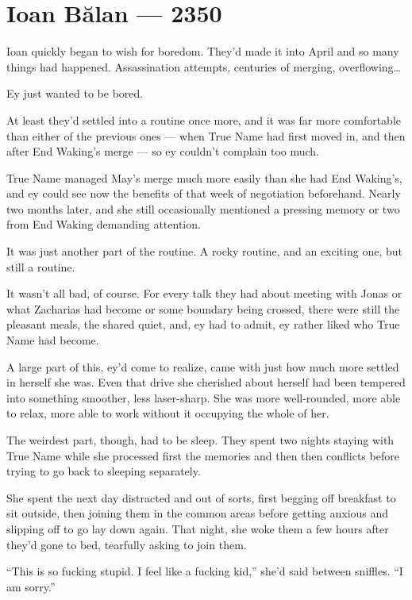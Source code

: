 \hypertarget{ioan-bux103lan-2350}{%
\chapter{Ioan Bălan — 2350}\label{ioan-bux103lan-2350}}

Ioan quickly began to wish for boredom. They'd made it into April and so many things had happened. Assassination attempts, centuries of merging, overflowing\ldots{}

Ey just wanted to be bored.

At least they'd settled into a routine once more, and it was far more comfortable than either of the previous ones — when True Name had first moved in, and then after End Waking's merge — so ey couldn't complain too much.

True Name managed May's merge much more easily than she had End Waking's, and ey could see now the benefits of that week of negotiation beforehand. Nearly two months later, and she still occasionally mentioned a pressing memory or two from End Waking demanding attention.

It was just another part of the routine. A rocky routine, and an exciting one, but still a routine.

It wasn't all bad, of course. For every talk they had about meeting with Jonas or what Zacharias had become or some boundary being crossed, there were still the pleasant meals, the shared quiet, and, ey had to admit, ey rather liked who True Name had become.

A large part of this, ey'd come to realize, came with just how much more settled in herself she was. Even that drive she cherished about herself had been tempered into something smoother, less laser-sharp. She was more well-rounded, more able to relax, more able to work without it occupying the whole of her.

The weirdest part, though, had to be sleep. They spent two nights staying with True Name while she processed first the memories and then then conflicts before trying to go back to sleeping separately.

She spent the next day distracted and out of sorts, first begging off breakfast to sit outside, then joining them in the common areas before getting anxious and slipping off to go lay down again. That night, she woke them a few hours after they'd gone to bed, tearfully asking to join them.

``This is so fucking stupid. I feel like a fucking kid,'' she'd said between sniffles. ``I am sorry.''

